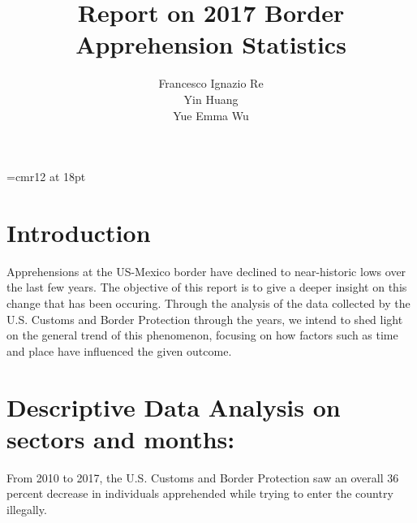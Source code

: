 \documentclass[journal, a4paper]{IEEEtran}
\begin{document}


\font\myfont=cmr12 at 18pt
	
	\title{ \myfont Report on 2017 Border Apprehension Statistics}
	\author{Francesco Ignazio Re\\
			Yin Huang	\\
			Yue Emma Wu
			}

	\maketitle

	
	\section{Introduction}
	
	Apprehensions at the US-Mexico border have declined to near-historic lows over the last few years.
	The objective of this report is to give a deeper insight on this change that has been occuring.
	Through the analysis of the data collected by the U.S. Customs and Border Protection through the years,
	we intend to shed light on the general trend of this phenomenon, focusing on how factors such as time and place have influenced the given outcome.
	
	
	
	
	
	
	
	\section{Descriptive Data Analysis on sectors and months:}
	
	From 2010 to 2017, the U.S. Customs and Border Protection saw an overall 36 percent decrease in individuals apprehended while trying to enter the country illegally. 
\end{document}
